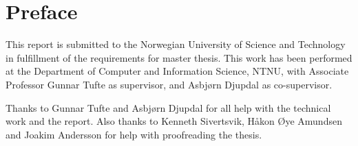 \chapter*{Preface}
\thispagestyle{empty}
This report is submitted to the Norwegian University of Science and Technology
in fulfillment of the requirements for master thesis. This work has been
performed at the Department of Computer and Information Science, NTNU, with
Associate Professor Gunnar Tufte as supervisor, and Asbjørn Djupdal as
co-supervisor.

Thanks to Gunnar Tufte and Asbjørn Djupdal for all help with the technical work
and the report. Also thanks to Kenneth Sivertsvik, Håkon Øye Amundsen and Joakim
Andersson for help with proofreading the thesis.
